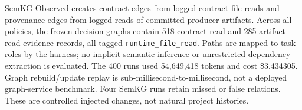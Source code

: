 \documentclass[a4paper,runningheads]{llncs}
\begin{document}
\begin{table}
\centering
\caption{Controlled repository evaluation (100 runs per policy). Resource means and total model costs include all runs; hidden pass counts retain evaluator errors as end-to-end failures.}
\label{tab:realworld}
\footnotesize
{}
\end{table}

SemKG-Observed creates contract edges from logged contract-file reads and provenance edges from logged reads of committed producer artifacts. Across all policies, the frozen decision graphs contain 518 contract-read and 285 artifact-read evidence records, all tagged \texttt{runtime\_file\_read}. Paths are mapped to task roles by the harness; no implicit semantic inference or unrestricted dependency extraction is evaluated. The 400 runs used 54,649,418 tokens and cost \$3.434305. Graph rebuild/update replay is sub-millisecond-to-millisecond, not a deployed graph-service benchmark. Four SemKG runs retain missed or false relations. These are controlled injected changes, not natural project histories.
\end{document}
